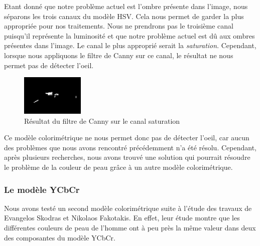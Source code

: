 Etant donné que notre problème actuel est l'ombre présente dans l'image, nous séparons les trois canaux du modèle HSV. Cela
nous permet de garder la plus appropriée pour nos traitements. Nous ne prendrons pas le troisième canal puisqu'il représente 
la luminosité et que notre problème actuel est dû aux ombres présentes dans l'image. Le canal le plus approprié serait la \textit{saturation}. 
Cependant, lorsque nous appliquons le filtre de Canny sur ce canal, le résultat ne nous permet pas de détecter l'oeil.

\begin{figure}[H]
 \center
 \includegraphics[width=3cm]{image/cannySaturation.png}
 \caption{Résultat du filtre de Canny sur le canal saturation}
\end{figure}

Ce modèle colorimétrique ne nous permet donc pas de détecter l'oeil, car aucun des problèmes que nous avons rencontré
précédemment n'a été résolu. Cependant, après plusieurs recherches, nous avons trouvé une solution qui pourrait résoudre
le problème de la couleur de peau grâce à un autre modèle colorimétrique.

\subsubsection{Le modèle YCbCr}

Nous avons testé un second modèle colorimétrique suite à l'étude des travaux de Evangelos Skodras et Nikolaos Fakotakis\cite{Skodras_2012ieee}.
En effet, leur étude montre que les différentes couleurs de peau de l'homme ont à peu près la même valeur dans deux des
composantes du modèle YCbCr.\\

